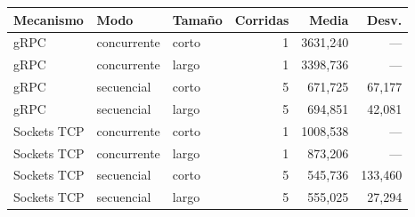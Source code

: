 \small\setlength{\tabcolsep}{4pt}
\begin{tabular}{lllrrr}
\toprule
Mecanismo & Modo & Tamaño & Corridas & Media & Desv. \\
\midrule
gRPC & concurrente & corto & 1 & 3631{,}240 & --- \\
gRPC & concurrente & largo & 1 & 3398{,}736 & --- \\
gRPC & secuencial & corto & 5 & 671{,}725 & 67{,}177 \\
gRPC & secuencial & largo & 5 & 694{,}851 & 42{,}081 \\
Sockets TCP & concurrente & corto & 1 & 1008{,}538 & --- \\
Sockets TCP & concurrente & largo & 1 & 873{,}206 & --- \\
Sockets TCP & secuencial & corto & 5 & 545{,}736 & 133{,}460 \\
Sockets TCP & secuencial & largo & 5 & 555{,}025 & 27{,}294 \\
\bottomrule
\end{tabular}
